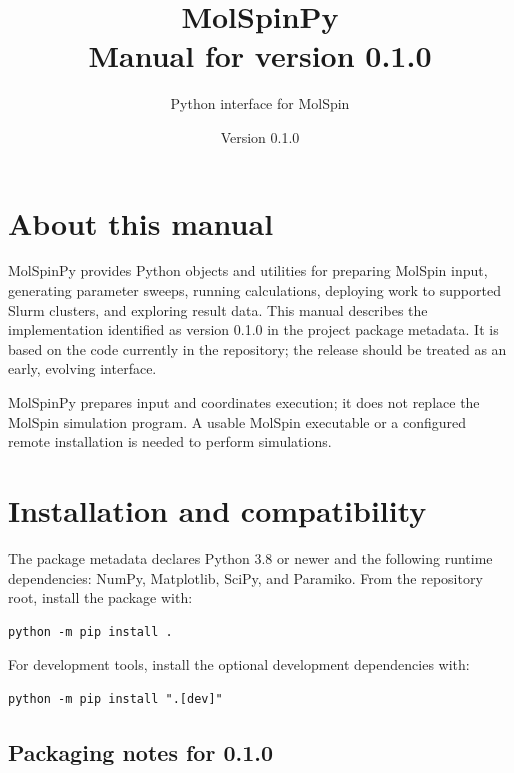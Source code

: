 \documentclass[11pt,a4paper]{article}
\title{\textbf{MolSpinPy}\\Manual for version 0.1.0}
\author{Python interface for MolSpin}
\date{Version 0.1.0}
\begin{document}
\maketitle
\tableofcontents
\newpage

\section{About this manual}

MolSpinPy provides Python objects and utilities for preparing MolSpin input,
generating parameter sweeps, running calculations, deploying work to supported
Slurm clusters, and exploring result data. This manual describes the
implementation identified as version 0.1.0 in the project package metadata.
It is based on the code currently in the repository; the release should be
treated as an early, evolving interface.

MolSpinPy prepares input and coordinates execution; it does not replace the
MolSpin simulation program. A usable MolSpin executable or a configured remote
installation is needed to perform simulations.

\section{Installation and compatibility}

The package metadata declares Python 3.8 or newer and the following runtime
dependencies: NumPy, Matplotlib, SciPy, and Paramiko. From the repository root,
install the package with:

\begin{lstlisting}
python -m pip install .
\end{lstlisting}

For development tools, install the optional development dependencies with:

\begin{lstlisting}
python -m pip install ".[dev]"
\end{lstlisting}

\subsection{Packaging notes for 0.1.0}
\end{document}
